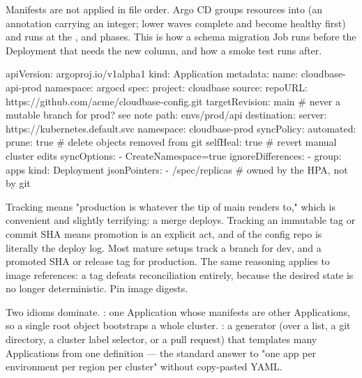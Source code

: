 Manifests are not applied in file order. Argo CD groups resources into  (an annotation carrying an integer; lower waves complete and become healthy first) and runs  at the ,  and  phases. This is how a schema migration Job runs before the Deployment that needs the new column, and how a smoke test runs after.

\begin{k8sbox}
apiVersion: argoproj.io/v1alpha1
kind: Application
metadata:
  name: cloudbase-api-prod
  namespace: argocd
spec:
  project: cloudbase
  source:
    repoURL: https://github.com/acme/cloudbase-config.git
    targetRevision: main            # never a mutable branch for prod? see note
    path: envs/prod/api
  destination:
    server: https://kubernetes.default.svc
    namespace: cloudbase-prod
  syncPolicy:
    automated:
      prune: true                   # delete objects removed from git
      selfHeal: true                # revert manual cluster edits
    syncOptions:
      - CreateNamespace=true
  ignoreDifferences:
    - group: apps
      kind: Deployment
      jsonPointers:
        - /spec/replicas             # owned by the HPA, not by git
\end{k8sbox}

\begin{tradeoff}
Tracking  means "production is whatever the tip of main renders to," which is convenient and slightly terrifying: a merge deploys. Tracking an immutable tag or commit SHA means promotion is an explicit act, and  of the config repo is literally the deploy log. Most mature setups track a branch for dev, and a promoted SHA or release tag for production. The same reasoning applies to image references: a  tag defeats reconciliation entirely, because the desired state is no longer deterministic. Pin image digests.
\end{tradeoff}

 Two idioms dominate. : one Application whose manifests are other Applications, so a single root object bootstraps a whole cluster. : a generator (over a list, a git directory, a cluster label selector, or a pull request) that templates many Applications from one definition --- the standard answer to "one app per environment per region per cluster" without copy-pasted YAML.

